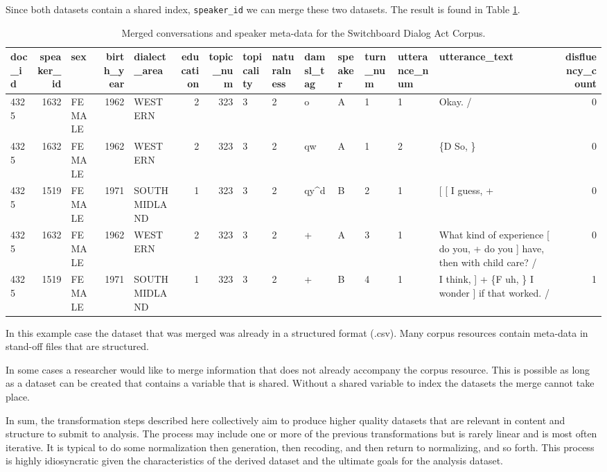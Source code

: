 \documentclass[
]{article}
\begin{document}
Since both datasets contain a shared index, \texttt{speaker\_id} we can merge these two datasets. The result is found in Table \ref{tab:merging-swda-speaker-added}.

\begin{table}

\caption{\label{tab:merging-swda-speaker-added}Merged conversations and speaker meta-data for the Switchboard Dialog Act Corpus.}
\centering
\begin{tabular}[t]{lrlrlrrlllllllr}
\toprule
doc\_id & speaker\_id & sex & birth\_year & dialect\_area & education & topic\_num & topicality & naturalness & damsl\_tag & speaker & turn\_num & utterance\_num & utterance\_text & disfluency\_count\\
\midrule
4325 & 1632 & FEMALE & 1962 & WESTERN & 2 & 323 & 3 & 2 & o & A & 1 & 1 & Okay.  / & 0\\
4325 & 1632 & FEMALE & 1962 & WESTERN & 2 & 323 & 3 & 2 & qw & A & 1 & 2 & \{D So, \} & 0\\
4325 & 1519 & FEMALE & 1971 & SOUTH MIDLAND & 1 & 323 & 3 & 2 & qy\textasciicircum{}d & B & 2 & 1 & {}[ [ I guess, + & 0\\
4325 & 1632 & FEMALE & 1962 & WESTERN & 2 & 323 & 3 & 2 & + & A & 3 & 1 & What kind of experience [ do you, + do you ] have, then with child care? / & 0\\
4325 & 1519 & FEMALE & 1971 & SOUTH MIDLAND & 1 & 323 & 3 & 2 & + & B & 4 & 1 & I think, ] + \{F uh, \} I wonder ] if that worked. / & 1\\
\bottomrule
\end{tabular}
\end{table}

In this example case the dataset that was merged was already in a structured format (.csv). Many corpus resources contain meta-data in stand-off files that are structured.

In some cases a researcher would like to merge information that does not already accompany the corpus resource. This is possible as long as a dataset can be created that contains a variable that is shared. Without a shared variable to index the datasets the merge cannot take place.

In sum, the transformation steps described here collectively aim to produce higher quality datasets that are relevant in content and structure to submit to analysis. The process may include one or more of the previous transformations but is rarely linear and is most often iterative. It is typical to do some normalization then generation, then recoding, and then return to normalizing, and so forth. This process is highly idiosyncratic given the characteristics of the derived dataset and the ultimate goals for the analysis dataset.
\end{document}
